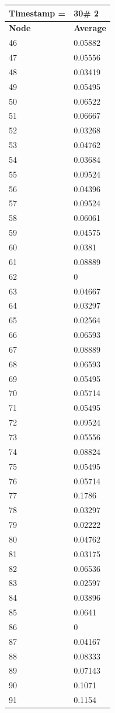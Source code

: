 \begin{tabular}{|l||l|}
\hline
\textbf{Timestamp =} & \textbf{30}\# 2\\\hline
	\textbf{Node} & \textbf{Average} \\ \hline
\hline
	46 & 0.05882 \\ \hline
	47 & 0.05556 \\ \hline
	48 & 0.03419 \\ \hline
	49 & 0.05495 \\ \hline
	50 & 0.06522 \\ \hline
	51 & 0.06667 \\ \hline
	52 & 0.03268 \\ \hline
	53 & 0.04762 \\ \hline
	54 & 0.03684 \\ \hline
	55 & 0.09524 \\ \hline
	56 & 0.04396 \\ \hline
	57 & 0.09524 \\ \hline
	58 & 0.06061 \\ \hline
	59 & 0.04575 \\ \hline
	60 & 0.0381 \\ \hline
	61 & 0.08889 \\ \hline
	62 & 0 \\ \hline
	63 & 0.04667 \\ \hline
	64 & 0.03297 \\ \hline
	65 & 0.02564 \\ \hline
	66 & 0.06593 \\ \hline
	67 & 0.08889 \\ \hline
	68 & 0.06593 \\ \hline
	69 & 0.05495 \\ \hline
	70 & 0.05714 \\ \hline
	71 & 0.05495 \\ \hline
	72 & 0.09524 \\ \hline
	73 & 0.05556 \\ \hline
	74 & 0.08824 \\ \hline
	75 & 0.05495 \\ \hline
	76 & 0.05714 \\ \hline
	77 & 0.1786 \\ \hline
	78 & 0.03297 \\ \hline
	79 & 0.02222 \\ \hline
	80 & 0.04762 \\ \hline
	81 & 0.03175 \\ \hline
	82 & 0.06536 \\ \hline
	83 & 0.02597 \\ \hline
	84 & 0.03896 \\ \hline
	85 & 0.0641 \\ \hline
	86 & 0 \\ \hline
	87 & 0.04167 \\ \hline
	88 & 0.08333 \\ \hline
	89 & 0.07143 \\ \hline
	90 & 0.1071 \\ \hline
	91 & 0.1154 \\ \hline
\end{tabular}
